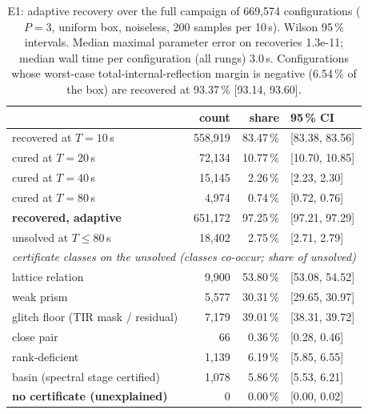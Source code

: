 \begin{table}[t]
\caption{E1: adaptive recovery over the full campaign of 669{,}574 configurations
($P{=}3$, uniform box, noiseless, 200 samples per 10\,s). Wilson 95\,\%
intervals. Median maximal parameter error on recoveries 1.3e-11; median wall
time per configuration (all rungs) 3.0\,s. Configurations whose worst-case
total-internal-reflection margin is negative (6.54\,\% of the box) are recovered at
93.37\,\% [93.14, 93.60].}
\label{tab:e1}
\centering\small
\begin{tabular}{lrrl}
\toprule
 & count & share & 95\,\% CI\\
\midrule
recovered at $T{=}10$\,s & 558{,}919 & 83.47\,\% & [83.38, 83.56] \\
cured at $T{=}20$\,s & 72{,}134 & 10.77\,\% & [10.70, 10.85] \\
cured at $T{=}40$\,s & 15{,}145 & 2.26\,\% & [2.23, 2.30] \\
cured at $T{=}80$\,s & 4{,}974 & 0.74\,\% & [0.72, 0.76] \\
\midrule
\textbf{recovered, adaptive} & 651{,}172 & 97.25\,\% & [97.21, 97.29] \\
unsolved at $T\le80$\,s & 18{,}402 & 2.75\,\% & [2.71, 2.79] \\
\midrule
\multicolumn{4}{l}{\emph{certificate classes on the unsolved (classes co-occur; share of unsolved)}}\\
\quad lattice relation & 9{,}900 & 53.80\,\% & [53.08, 54.52] \\
\quad weak prism & 5{,}577 & 30.31\,\% & [29.65, 30.97] \\
\quad glitch floor (TIR mask / residual) & 7{,}179 & 39.01\,\% & [38.31, 39.72] \\
\quad close pair & 66 & 0.36\,\% & [0.28, 0.46] \\
\quad rank-deficient & 1{,}139 & 6.19\,\% & [5.85, 6.55] \\
\quad basin (spectral stage certified) & 1{,}078 & 5.86\,\% & [5.53, 6.21] \\
\quad \textbf{no certificate (unexplained)} & 0 & 0.00\,\% & [0.00, 0.02] \\
\bottomrule
\end{tabular}
\end{table}
